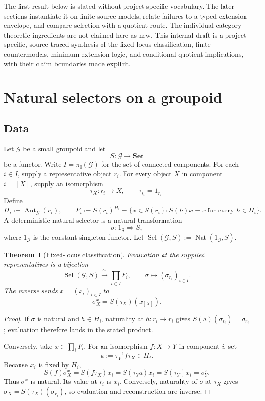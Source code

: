 \documentclass[11pt]{article}
\newtheorem{theorem}{Theorem}
\theoremstyle{definition}
\newcommand{\G}{\mathcal G}
\newcommand{\Nat}{\operatorname{Nat}}
\newcommand{\Aut}{\operatorname{Aut}}
\newcommand{\Sel}{\operatorname{Sel}}
\begin{document}
The first result below is stated without project-specific vocabulary.  The
later sections instantiate it on finite source models, relate failures to a
typed extension envelope, and compare selection with a quotient route.  The
individual category-theoretic ingredients are not claimed here as new.  This
internal draft is a project-specific, source-traced synthesis of the
fixed-locus classification, finite countermodels,
minimum-extension logic, and conditional quotient implications, with their
claim boundaries made explicit.

\section{Natural selectors on a groupoid}

\subsection{Data}

Let \(\G\) be a small groupoid and let
\[
  S:\G\longrightarrow\mathbf{Set}
\]
be a functor.  Write \(I=\pi_0(\G)\) for the set of connected components.
For each \(i\in I\), supply a representative object \(r_i\).  For every
object \(X\) in component \(i=[X]\), supply an isomorphism
\[
  \tau_X:r_i\longrightarrow X,\qquad \tau_{r_i}=1_{r_i}.
\]
Define
\[
  H_i:=\Aut_{\G}(r_i),\qquad
  F_i:=S(r_i)^{H_i}
  =\{x\in S(r_i):S(h)x=x\ \text{for every }h\in H_i\}.
\]
A deterministic natural selector is a natural transformation
\[
  \sigma:1_{\G}\Rightarrow S,
\]
where \(1_{\G}\) is the constant singleton functor.  Let
\(\Sel(\G,S):=\Nat(1_{\G},S)\).

\begin{theorem}[Fixed-locus classification]
\label{thm:classification}
Evaluation at the supplied representatives is a bijection
\[
  \Sel(\G,S)\xrightarrow{\;\cong\;}\prod_{i\in I}F_i,\qquad
  \sigma\longmapsto(\sigma_{r_i})_{i\in I}.
\]
The inverse sends \(x=(x_i)_{i\in I}\) to
\[
  \sigma^x_X=S(\tau_X)(x_{[X]}).
\]
\end{theorem}

\begin{proof}
If \(\sigma\) is natural and \(h\in H_i\), naturality at
\(h:r_i\to r_i\) gives \(S(h)(\sigma_{r_i})=\sigma_{r_i}\); evaluation
therefore lands in the stated product.

Conversely, take \(x\in\prod_iF_i\).  For an isomorphism \(f:X\to Y\) in
component \(i\), set
\[
  a:=\tau_Y^{-1}f\tau_X\in H_i.
\]
Because \(x_i\) is fixed by \(H_i\),
\[
  S(f)\sigma^x_X
  =S(f\tau_X)x_i
  =S(\tau_Ya)x_i
  =S(\tau_Y)x_i
  =\sigma^x_Y.
\]
Thus \(\sigma^x\) is natural.  Its value at \(r_i\) is \(x_i\).
Conversely, naturality of \(\sigma\) at \(\tau_X\) gives
\(\sigma_X=S(\tau_X)(\sigma_{r_i})\), so evaluation and reconstruction are
inverse.
\end{proof}
\end{document}
